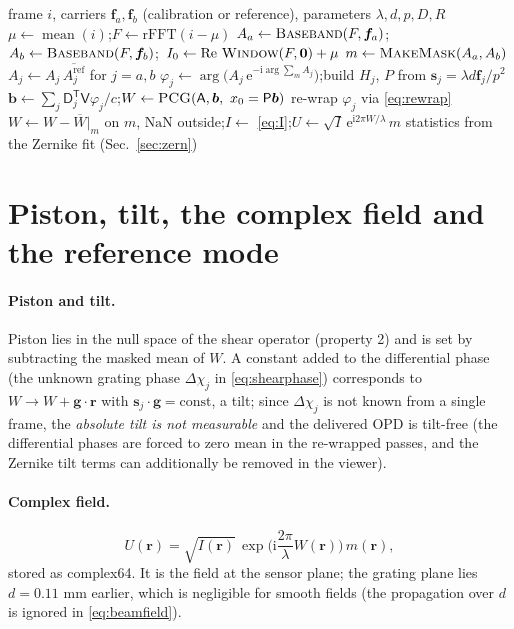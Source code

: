 \documentclass[11pt,a4paper]{article}
\theoremstyle{definition}
\newcommand{\vr}{\bm{r}}
\newcommand{\vs}{\bm{s}}
\newcommand{\vf}{\bm{f}}
\newcommand{\ii}{\mathrm{i}}
\newcommand{\ee}{\mathrm{e}}
\newcommand{\Dop}{\mathsf{D}}
\newcommand{\Vop}{\mathsf{V}}
\newcommand{\Aop}{\mathsf{A}}
\newcommand{\Pop}{\mathsf{P}}
\newcommand{\Real}{\operatorname{Re}}
\newcommand{\code}[1]{\texttt{\small #1}}
\begin{document}
\begin{algorithm}[h]
\caption{Reconstruction of one frame (\code{reconstruct})}
\label{alg:recon}
\begin{algorithmic}[1]
\Require frame $i$, carriers $\vf_a,\vf_b$ (calibration or reference), parameters $\lambda,d,p,D,R$
\State $\mu\gets\operatorname{mean}(i)$;\quad $F\gets\mathrm{rFFT}(i-\mu)$
\State $A_a\gets\textsc{Baseband}(F,\vf_a)$;\ $A_b\gets\textsc{Baseband}(F,\vf_b)$;\ $I_0\gets\Real\,\textsc{Window}(F,\bm0)+\mu$
\State $m\gets\textsc{MakeMask}(A_a,A_b)$
 \State $A_j\gets A_j\,\overline{A_j^{\mathrm{ref}}}$ for $j=a,b$ \EndIf
\State $\varphi_j\gets\arg\big(A_j\,\ee^{-\ii\arg\sum_mA_j}\big)$;\quad build $H_j$, $P$ from $\vs_j=\lambda d\vf_j/p^2$
  \State $\bm b\gets\sum_j\Dop_j^{\mathsf T}\Vop\varphi_j/c$;\quad $W\gets\textsc{PCG}(\Aop,\bm b,\ x_0=\Pop\bm b)$
   \State re-wrap $\varphi_j$ via \eqref{eq:rewrap} \EndIf
\EndFor
\State $W\gets W-\overline{W}|_m$ on $m$, $\mathrm{NaN}$ outside;\quad $I\gets$ \eqref{eq:I};\quad $U\gets\sqrt I\,\ee^{\ii2\pi W/\lambda}\,m$
\State statistics from the Zernike fit (Sec.~\ref{sec:zern})
\end{algorithmic}
\end{algorithm}

\section{Piston, tilt, the complex field and the reference mode}
\label{sec:piston}
\paragraph{Piston and tilt.}
Piston lies in the null space of the shear operator (property 2) and is set by subtracting the masked mean of $W$. A constant added to the differential phase
(the unknown grating phase $\Delta\chi_j$ in \eqref{eq:shearphase}) corresponds to $W\to W+\bm g\cdot\vr$ with $\vs_j\cdot\bm g=\text{const}$, a tilt; since $\Delta\chi_j$ is not
known from a single frame, the \emph{absolute tilt is not measurable} and the delivered OPD is tilt-free (the differential phases are forced to zero mean in the re-wrapped passes, and the Zernike tilt terms can additionally be removed in the viewer).

\paragraph{Complex field.}
\begin{equation}
U(\vr)=\sqrt{I(\vr)}\,\exp\!\Big(\ii\frac{2\pi}{\lambda}W(\vr)\Big)\,m(\vr),
\end{equation}
stored as complex64. It is the field at the sensor plane; the grating plane lies $d=0.11$ mm earlier, which is negligible for smooth fields (the propagation over $d$ is ignored in \eqref{eq:beamfield}).
\end{document}

